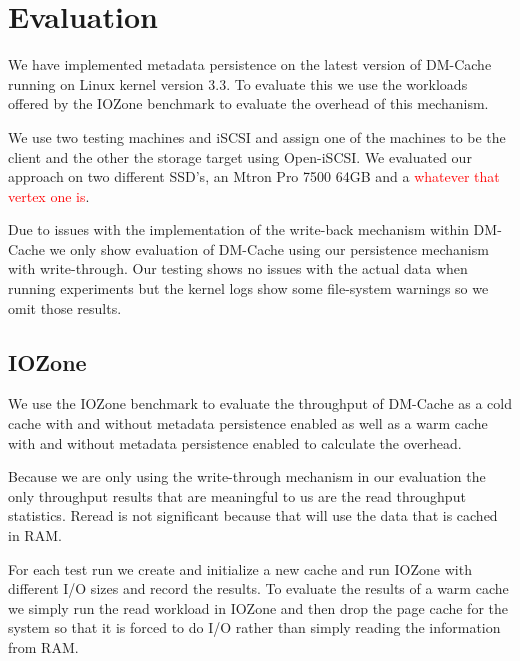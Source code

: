 \section{Evaluation}
\label{sec:evaluation}

We have implemented metadata persistence on the latest version of
DM-Cache running on Linux kernel version 3.3. To evaluate this we use
the workloads offered by the IOZone benchmark to evaluate the overhead
of this mechanism.

We use two testing machines and iSCSI and assign one of the machines
to be the client and the other the storage target using Open-iSCSI. We
evaluated our approach on two different SSD's, an Mtron Pro 7500 64GB
and a \textcolor{red}{whatever that vertex one is}.

Due to issues with the implementation of the write-back mechanism
within DM-Cache we only show evaluation of DM-Cache using our
persistence mechanism with write-through. Our testing shows no issues
with the actual data when running experiments but the kernel logs show
some file-system warnings so we omit those results.

\subsection{IOZone}

We use the IOZone benchmark to evaluate the throughput of DM-Cache as
a cold cache with and without metadata persistence enabled as well as
a warm cache with and without metadata persistence enabled to
calculate the overhead.

Because we are only using the write-through mechanism in our
evaluation the only throughput results that are meaningful to us are
the read throughput statistics. Reread is not significant because that
will use the data that is cached in RAM.

For each test run we create and initialize a new cache and run IOZone
with different I/O sizes and record the results. To evaluate the
results of a warm cache we simply run the read workload in IOZone and
then drop the page cache for the system so that it is forced to do I/O
rather than simply reading the information from RAM.


